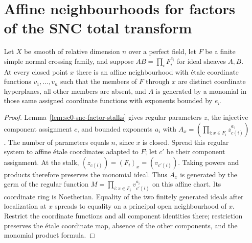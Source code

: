 \section{Affine neighbourhoods for factors of the SNC total transform}

\begin{lemma}\label{lem:sc0-snc-affine-factor-neighbourhood}
\leanok
{}
Let $X$ be smooth of relative dimension $n$ over a perfect field, let $F$ be a finite simple
normal crossing family, and suppose $AB=\prod_iF_i^{e_i}$ for ideal sheaves $A,B$.
At every closed point $x$ there is an affine neighbourhood with \'etale coordinate functions
$v_1,\ldots,v_n$ such that the members of $F$ through $x$ are distinct coordinate hyperplanes,
all other members are absent, and $A$ is generated by a monomial in those same assigned
coordinate functions with exponents bounded by $e_i$.
\end{lemma}
\begin{proof}
Lemma~\ref{lem:sc0-snc-factor-stalks} gives regular parameters $z$, the injective component
assignment $c$, and bounded exponents $a_i$ with
$A_x=(\prod_{i:x\in F_i}z_{c(i)}^{a_i})$. The number of parameters equals $n$, since $x$ is closed.
Spread this regular system to affine \'etale coordinates adapted to $F$; let $c'$ be their
component assignment. At the stalk, $(z_{c(i)})=(F_i)_x=(v_{c'(i)})$. Taking powers and products
therefore preserves the monomial ideal. Thus $A_x$ is generated by the germ of the regular
function $M=\prod_{i:x\in F_i}v_{c'(i)}^{a_i}$ on this affine chart.
Its coordinate ring is Noetherian. Equality of the two finitely generated ideals after
localization at $x$ spreads to equality on a principal open neighbourhood of $x$. Restrict the
coordinate functions and all component identities there; restriction preserves the \'etale
coordinate map, absence of the other components, and the monomial product formula.
\end{proof}

